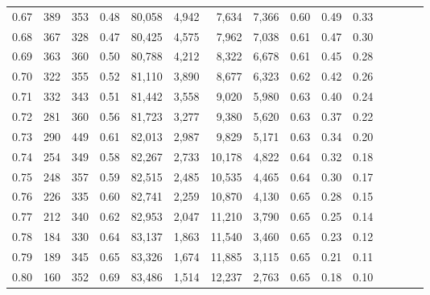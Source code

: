 \begin{tabular}{rrrcrrrrrrrrrrr}
0.67 &    389 &  353 &                                       0.48 &  80,058 &   4,942 &   7,634 &   7,366 &  0.60 &  0.49 &                         0.33 \\
0.68 &    367 &  328 &                                       0.47 &  80,425 &   4,575 &   7,962 &   7,038 &  0.61 &  0.47 &                         0.30 \\
0.69 &    363 &  360 &                                       0.50 &  80,788 &   4,212 &   8,322 &   6,678 &  0.61 &  0.45 &                         0.28 \\
0.70 &    322 &  355 &                                       0.52 &  81,110 &   3,890 &   8,677 &   6,323 &  0.62 &  0.42 &                         0.26 \\
0.71 &    332 &  343 &                                       0.51 &  81,442 &   3,558 &   9,020 &   5,980 &  0.63 &  0.40 &                         0.24 \\
0.72 &    281 &  360 &                                       0.56 &  81,723 &   3,277 &   9,380 &   5,620 &  0.63 &  0.37 &                         0.22 \\
0.73 &    290 &  449 &                                       0.61 &  82,013 &   2,987 &   9,829 &   5,171 &  0.63 &  0.34 &                         0.20 \\
0.74 &    254 &  349 &                                       0.58 &  82,267 &   2,733 &  10,178 &   4,822 &  0.64 &  0.32 &                         0.18 \\
0.75 &    248 &  357 &                                       0.59 &  82,515 &   2,485 &  10,535 &   4,465 &  0.64 &  0.30 &                         0.17 \\
0.76 &    226 &  335 &                                       0.60 &  82,741 &   2,259 &  10,870 &   4,130 &  0.65 &  0.28 &                         0.15 \\
0.77 &    212 &  340 &                                       0.62 &  82,953 &   2,047 &  11,210 &   3,790 &  0.65 &  0.25 &                         0.14 \\
0.78 &    184 &  330 &                                       0.64 &  83,137 &   1,863 &  11,540 &   3,460 &  0.65 &  0.23 &                         0.12 \\
0.79 &    189 &  345 &                                       0.65 &  83,326 &   1,674 &  11,885 &   3,115 &  0.65 &  0.21 &                         0.11 \\
0.80 &    160 &  352 &                                       0.69 &  83,486 &   1,514 &  12,237 &   2,763 &  0.65 &  0.18 &                         0.10 \\

\end{tabular}
